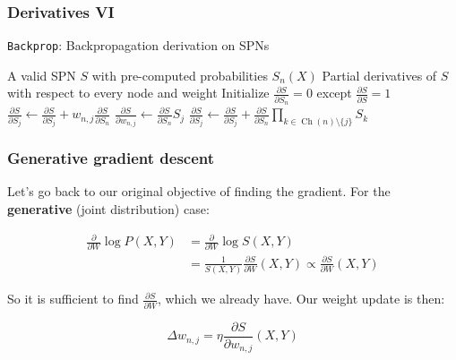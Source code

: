 \documentclass[usenames,dvipsnames]{beamer}
\DeclareMathOperator*{\Ch}{\text{Ch}}
\newcommand{\ddspn}[2]{\frac{\partial#1}{\partial#2}}
\newcommand{\code}[1]{\lstinline[mathescape=true]{#1}}
\begin{document}
\begin{frame}
  \frametitle{Derivatives VI}

  \begin{algorithm}[H]
    \caption{\code{Backprop}: Backpropagation derivation on SPNs}
    \begin{algorithmic}[1]
      \Require A valid SPN $S$ with pre-computed probabilities $S_n(X)$
      \Ensure Partial derivatives of $S$ with respect to every node and weight
      \State Initialize $\ddspn{S}{S_n}=0$ except $\ddspn{S}{S}=1$
          \For{all $j\in\Ch(n)$}
            \State $\ddspn{S}{S_j}\gets\ddspn{S}{S_j}+w_{n,j}\ddspn{S}{S_n}$
            \State $\ddspn{S}{w_{n,j}}\gets\ddspn{S}{S_n}S_j$
          \EndFor%
        \Else%
          \For{all $j\in\Ch(n)$}
            \State $\ddspn{S}{S_j}\gets\ddspn{S}{S_j}+\ddspn{S}{S_n}\prod_{k\in\Ch(n)\setminus
              \{j\}}S_k$
          \EndFor%
        \EndIf
      \EndFor%
    \end{algorithmic}
  \end{algorithm}
\end{frame}

\begin{frame}
  \frametitle{Generative gradient descent}

  Let's go back to our original objective of finding the gradient. For the \textbf{generative}
  (joint distribution) case:

  \begin{align*}
    \ddspn{}{W}\log P(X,Y)&=\ddspn{}{W}\log S(X,Y)\\
                          &=\frac{1}{S(X,Y)}\ddspn{S}{W}(X,Y)\propto\ddspn{S}{W}(X,Y)
  \end{align*}

  So it is sufficient to find $\ddspn{S}{W}$, which we already have. Our weight update is then:

  \begin{equation*}
    \Delta w_{n,j}=\eta\ddspn{S}{w_{n,j}}(X,Y)
  \end{equation*}
\end{frame}
\end{document}
